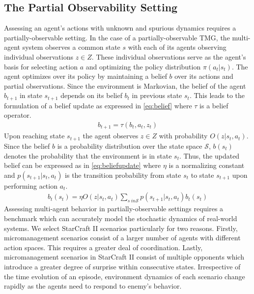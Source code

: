 \documentclass{article}
\begin{document}
\begin{multicols}{2}
\subsection{The Partial Observability Setting}
Assessing an agent's actions with unknown and spurious dynamics requires a partially-observable setting. In the case of a partially-observable TMG, the multi-agent system observes a common state $s$ with each of its agents observing individual observations $z \in Z$. These individual observations serve as the agent's basis for selecting action $a$ and optimizing the policy distribution $\pi(a_{t}|s_{t})$. The agent optimizes over its policy by maintaining a belief $b$ over its actions and partial observations. Since the environment is Markovian, the belief of the agent $b_{t+1}$ in state $s_{t+1}$ depends on its belief $b_{t}$ in previous state $s_{t}$. This leads to the formulation of a belief update as expressed in \autoref{eq:belief} where $\tau$ is a belief operator.
\begin{gather}
  b_{t+1} = \tau(b_{t},a_{t},z_{t}) \label{eq:belief}
\end{gather}
Upon reaching state $s_{t+1}$ the agent observes $z \in Z$ with probability $O(z|s_{t},a_{t})$. Since the belief $b$ is a probability distribution over the state space $\mathcal{S}$, $b(s_{t})$ denotes the probability that the environment is in state $s_{t}$. Thus, the updated belief can be expressed as in \autoref{eq:beliefupdate} where $\eta$ is a normalizing constant and $p(s_{t+1}|s_{t},a_{t})$ is the transition probability from state $s_{t}$ to state $s_{t+1}$ upon performing action $a_{t}$.
\begin{gather}
  b_{t}(s_{t}) = \eta O(z|s_{t},a_{t})\sum_{s\ in \mathcal{S}}p(s_{t+1}|s_{t},a_{t})b_{t}(s_{t}) \label{eq:beliefupdate}
\end{gather}
Assessing multi-agent behavior in partially-observable settings requires a benchmark which can accurately model the stochastic dynamics of real-world systems. We select StarCraft II \cite{smac} scenarios particularly for two reasons. Firstly, micromanagement scenarios consist of a larger number of agents with different action spaces. This requires a greater deal of coordination. Lastly, micromanagement scenarios in StarCraft II consist of multiple opponents which introduce a greater degree of surprise within consecutive states. Irrespective of the time evolution of an episode, environment dynamics of each scenario change rapidly as the agents need to respond to enemy's behavior. 


\end{multicols}
\end{document}
